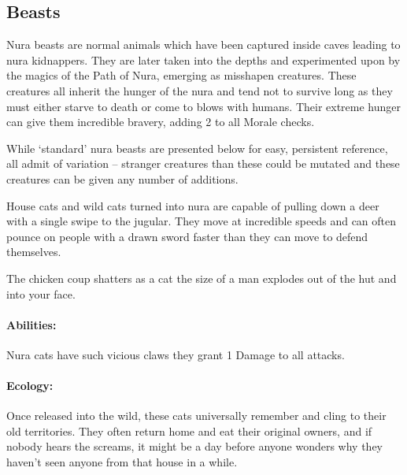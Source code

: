 \begin{multicols}{2}

\subsection{Beasts}

Nura beasts are normal animals which have been captured inside caves leading to nura kidnappers.
They are later taken into the depths and experimented upon by the magics of the Path of Nura, emerging as misshapen creatures.
These creatures all inherit the hunger of the nura and tend not to survive long as they must either starve to death or come to blows with humans.
Their extreme hunger can give them incredible bravery, adding 2 to all Morale checks.

While `standard' nura beasts are presented below for easy, persistent reference, all admit of variation -- stranger creatures than these could be mutated and these creatures can be given any number of additions.

\label{nura_cat}

House cats and wild cats turned into nura are capable of pulling down a deer with a single swipe to the jugular.
They move at incredible speeds and can often pounce on people with a drawn sword faster than they can move to defend themselves.

\begin{boxtext}

	The chicken coup shatters as a cat the size of a man explodes out of the hut and into your face.

\end{boxtext}

\paragraph{Abilities:}Nura cats have such vicious claws they grant 1 Damage to all attacks.

\paragraph{Ecology:} Once released into the wild, these cats universally remember and cling to their old territories.
They often return home and eat their original owners, and if nobody hears the screams, it might be a day before anyone wonders why they haven't seen anyone from that house in a while.

\begin{boxtext}


\end{boxtext}
\end{multicols}
